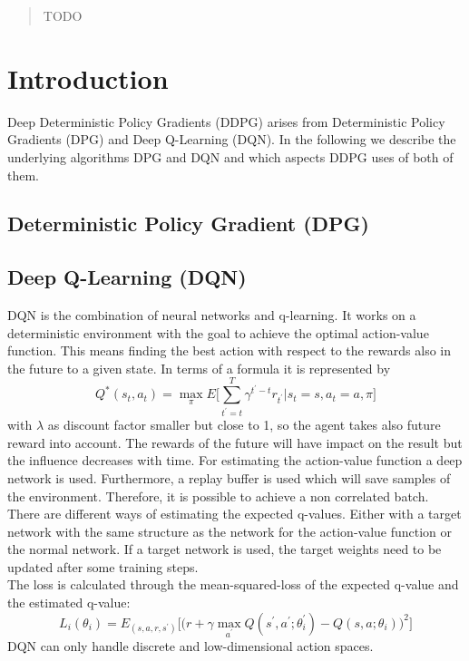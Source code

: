 \date{Received: date / Accepted: date}


\maketitle

\begin{abstract}
TODO
\end{abstract}

\section{Introduction}
\label{sec:intro}

Deep Deterministic Policy Gradients (DDPG) arises from Deterministic Policy 
Gradients (DPG) and Deep Q-Learning (DQN). In the following we describe the 
underlying algorithms DPG and DQN and which aspects DDPG uses of both of them. 
\subsection{Deterministic Policy Gradient (DPG)}
\label{sec:DPG}
\subsection{Deep Q-Learning (DQN)}
\label{sec:DQN}
DQN is the combination of neural networks and q-learning. It works on a 
deterministic environment with the goal to achieve the optimal action-value 
function. This means finding the best action with respect to the rewards also 
in the future to a given state. In terms of a formula it is represented by \[ 
Q^*(s_t,a_t)=\underset{\pi}{\max}E\Biggl\lbrack 
\sum_{t^{'}=t}^{T}\gamma^{t^{'}-t}r_{t^{'}}|s_t=s,
a_t=a, \pi \Biggr\rbrack
\]
 with $\lambda$ as discount factor smaller but close to 1, 
so the agent takes also future reward into account. The rewards of the future 
will have impact on the result but the influence decreases with time. For 
estimating the action-value function a deep network is used. Furthermore, a 
replay buffer is used which will save samples of the environment. Therefore, it 
is possible to achieve a non correlated batch. There are different ways of 
estimating the expected q-values. Either with a target network with the same 
structure as the network for the action-value function or the normal network. 
If a target network is used, the target weights need to be updated after some 
training steps.\\
The loss is calculated through the mean-squared-loss of the expected q-value 
and the estimated q-value: \[L_i(\theta_i)=E_{(s,a,r,s^{'})}
\biggl\lbrack\biggl(r+\gamma \underset{a^{'}}{\max} Q(s^{'}, 
a^{'};\theta_i^{'})-Q(s,a;\theta_i)\biggr)^2\biggr\rbrack \]
DQN can only handle discrete and low-dimensional action spaces.

